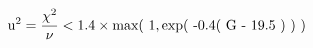 \begingroup
\large
\begin{equation}
  \textnormal{u}^2 = \frac{\chi^2}{\nu} < 1.4 \times \textnormal{max} (~1, \textnormal{exp(~-0.4(~\textnormal{G} - 19.5~)~)}~)
 \label{eq:WeightError}
\end{equation}
\endgroup \\

% 
